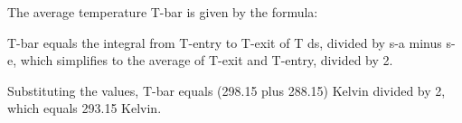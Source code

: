 The average temperature T-bar is given by the formula:

T-bar equals the integral from T-entry to T-exit of T ds, divided by s-a minus s-e, which simplifies to the average of T-exit and T-entry, divided by 2.

Substituting the values, T-bar equals (298.15 plus 288.15) Kelvin divided by 2, which equals 293.15 Kelvin.
